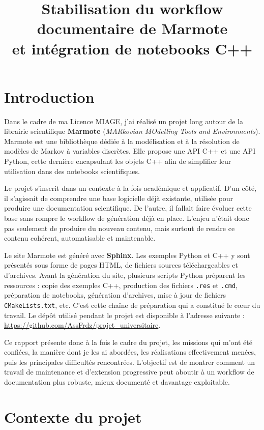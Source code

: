 \documentclass[a4paper,12pt,twoside]{article}
\title{Stabilisation du workflow documentaire de Marmote\\et intégration de notebooks C++}
\begin{document}
\pagedegarde
\newpage

\tableofcontents
\newpage

\section{Introduction}

Dans le cadre de ma Licence MIAGE, j'ai réalisé un projet long autour de la librairie scientifique \textbf{Marmote} (\emph{MARkovian MOdelling Tools and Environments}). Marmote est une bibliothèque dédiée à la modélisation et à la résolution de modèles de Markov à variables discrètes. Elle propose une API C++ et une API Python, cette dernière encapsulant les objets C++ afin de simplifier leur utilisation dans des notebooks scientifiques.

Le projet s'inscrit dans un contexte à la fois académique et applicatif. D'un côté, il s'agissait de comprendre une base logicielle déjà existante, utilisée pour produire une documentation scientifique. De l'autre, il fallait faire évoluer cette base sans rompre le workflow de génération déjà en place. L'enjeu n'était donc pas seulement de produire du nouveau contenu, mais surtout de rendre ce contenu cohérent, automatisable et maintenable.

Le site Marmote est généré avec \textbf{Sphinx}. Les exemples Python et C++ y sont présentés sous forme de pages HTML, de fichiers sources téléchargeables et d'archives. Avant la génération du site, plusieurs scripts Python préparent les ressources : copie des exemples C++, production des fichiers \texttt{.res} et \texttt{.cmd}, préparation de notebooks, génération d'archives, mise à jour de fichiers \texttt{CMakeLists.txt}, etc. C'est cette chaîne de préparation qui a constitué le cœur du travail. Le dépôt utilisé pendant le projet est disponible à l'adresse suivante : \url{https://github.com/AssFrdz/projet_universitaire}.

Ce rapport présente donc à la fois le cadre du projet, les missions qui m'ont été confiées, la manière dont je les ai abordées, les réalisations effectivement menées, puis les principales difficultés rencontrées. L'objectif est de montrer comment un travail de maintenance et d'extension progressive peut aboutir à un workflow de documentation plus robuste, mieux documenté et davantage exploitable.

\section{Contexte du projet}
\end{document}
